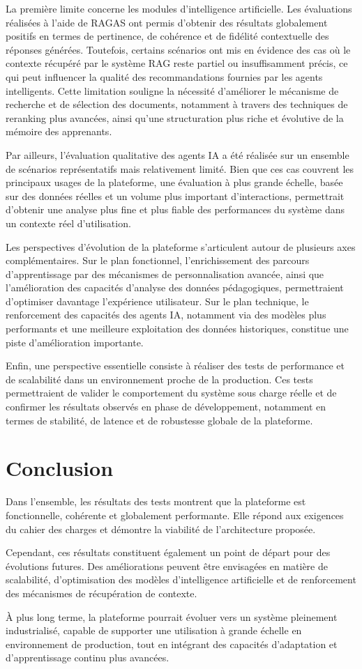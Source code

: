 La première limite concerne les modules d'intelligence artificielle. Les évaluations réalisées à l'aide de RAGAS ont permis d'obtenir des résultats globalement positifs en termes de pertinence, de cohérence et de fidélité contextuelle des réponses générées. Toutefois, certains scénarios ont mis en évidence des cas où le contexte récupéré par le système RAG reste partiel ou insuffisamment précis, ce qui peut influencer la qualité des recommandations fournies par les agents intelligents. Cette limitation souligne la nécessité d'améliorer le mécanisme de recherche et de sélection des documents, notamment à travers des techniques de reranking plus avancées, ainsi qu'une structuration plus riche et évolutive de la mémoire des apprenants.

Par ailleurs, l'évaluation qualitative des agents IA a été réalisée sur un ensemble de scénarios représentatifs mais relativement limité. Bien que ces cas couvrent les principaux usages de la plateforme, une évaluation à plus grande échelle, basée sur des données réelles et un volume plus important d'interactions, permettrait d'obtenir une analyse plus fine et plus fiable des performances du système dans un contexte réel d'utilisation.

Les perspectives d'évolution de la plateforme s'articulent autour de plusieurs axes complémentaires. Sur le plan fonctionnel, l'enrichissement des parcours d'apprentissage par des mécanismes de personnalisation avancée, ainsi que l'amélioration des capacités d'analyse des données pédagogiques, permettraient d'optimiser davantage l'expérience utilisateur. Sur le plan technique, le renforcement des capacités des agents IA, notamment via des modèles plus performants et une meilleure exploitation des données historiques, constitue une piste d'amélioration importante.

Enfin, une perspective essentielle consiste à réaliser des tests de performance et de scalabilité dans un environnement proche de la production. Ces tests permettraient de valider le comportement du système sous charge réelle et de confirmer les résultats observés en phase de développement, notamment en termes de stabilité, de latence et de robustesse globale de la plateforme.

\section{Conclusion}

Dans l'ensemble, les résultats des tests montrent que la plateforme est fonctionnelle, cohérente et globalement performante. Elle répond aux exigences du cahier des charges et démontre la viabilité de l'architecture proposée.

Cependant, ces résultats constituent également un point de départ pour des évolutions futures. Des améliorations peuvent être envisagées en matière de scalabilité, d'optimisation des modèles d'intelligence artificielle et de renforcement des mécanismes de récupération de contexte.

À plus long terme, la plateforme pourrait évoluer vers un système pleinement industrialisé, capable de supporter une utilisation à grande échelle en environnement de production, tout en intégrant des capacités d'adaptation et d'apprentissage continu plus avancées.
